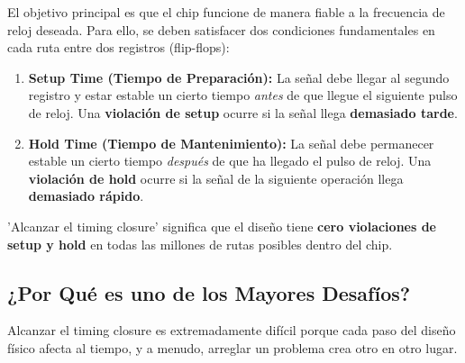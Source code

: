 \documentclass[12pt,a4paper]{article}
\begin{document}
El objetivo principal es que el chip funcione de manera fiable a la frecuencia de reloj deseada. Para ello, se deben satisfacer dos condiciones fundamentales en cada ruta entre dos registros (flip-flops):

\begin{enumerate}
    \item \textbf{Setup Time (Tiempo de Preparación):} La señal debe llegar al segundo registro y estar estable un cierto tiempo \textit{antes} de que llegue el siguiente pulso de reloj. Una \textbf{violación de setup} ocurre si la señal llega \textbf{demasiado tarde}.
    \item \textbf{Hold Time (Tiempo de Mantenimiento):} La señal debe permanecer estable un cierto tiempo \textit{después} de que ha llegado el pulso de reloj. Una \textbf{violación de hold} ocurre si la señal de la siguiente operación llega \textbf{demasiado rápido}.
\end{enumerate}

'Alcanzar el timing closure' significa que el diseño tiene \textbf{cero violaciones de setup y hold} en todas las millones de rutas posibles dentro del chip.

\subsection{¿Por Qué es uno de los Mayores Desafíos?}

Alcanzar el timing closure es extremadamente difícil porque cada paso del diseño físico afecta al tiempo, y a menudo, arreglar un problema crea otro en otro lugar.
\end{document}
